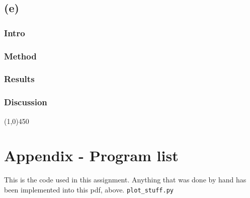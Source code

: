 \documentclass[11pt,a4paper,notitlepage]{article}
\begin{document}
\subsection{(e)}
\subsubsection{Intro}
\subsubsection{Method}
\subsubsection{Results}
\subsubsection{Discussion}


\begin{center}
\line(1,0){450}
\end{center}

\newpage
\section{Appendix - Program list}
This is the code used in this assignment. Anything that was done by hand has been implemented into this pdf, above.
\lstset{style=pystyle}
\verb|plot_stuff.py|

\end{document}
